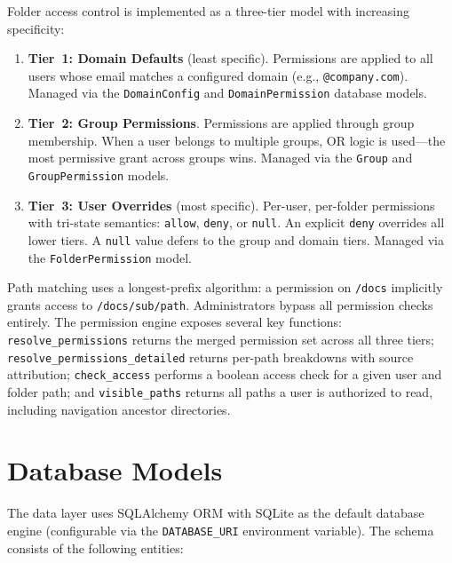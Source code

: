 \documentclass[12pt,letterpaper]{report}
\begin{document}
Folder access control is implemented as a three-tier model with increasing specificity:

\begin{enumerate}
    \item \textbf{Tier~1: Domain Defaults} (least specific). Permissions are applied to all users whose email matches a configured domain (e.g., \texttt{@company.com}). Managed via the \texttt{DomainConfig} and \texttt{DomainPermission} database models.

    \item \textbf{Tier~2: Group Permissions}. Permissions are applied through group membership. When a user belongs to multiple groups, OR logic is used---the most permissive grant across groups wins. Managed via the \texttt{Group} and \texttt{GroupPermission} models.

    \item \textbf{Tier~3: User Overrides} (most specific). Per-user, per-folder permissions with tri-state semantics: \texttt{allow}, \texttt{deny}, or \texttt{null}. An explicit \texttt{deny} overrides all lower tiers. A \texttt{null} value defers to the group and domain tiers. Managed via the \texttt{FolderPermission} model.
\end{enumerate}

Path matching uses a longest-prefix algorithm: a permission on \texttt{/docs} implicitly grants access to \texttt{/docs/sub/path}. Administrators bypass all permission checks entirely. The permission engine exposes several key functions: \texttt{resolve\_permissions} returns the merged permission set across all three tiers; \texttt{resolve\_permissions\_detailed} returns per-path breakdowns with source attribution; \texttt{check\_access} performs a boolean access check for a given user and folder path; and \texttt{visible\_paths} returns all paths a user is authorized to read, including navigation ancestor directories.

\section{Database Models}

The data layer uses SQLAlchemy ORM with SQLite as the default database engine (configurable via the \texttt{DATABASE\_URI} environment variable). The schema consists of the following entities:
\end{document}
